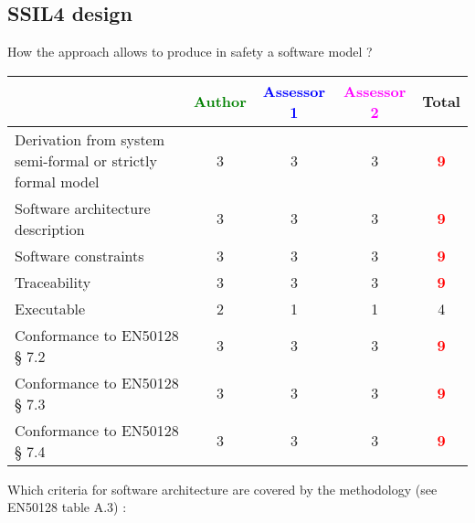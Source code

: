 \subsection{SSIL4 design}

How the approach allows to produce in safety a software model ?

\begin{tabular}{|l | c | c | c | c|}
\hline
& \textcolor{green}{Author} & \textcolor{blue}{Assessor 1} & \textcolor{magenta}{Assessor 2} & Total \\
\hline
Derivation from system semi-formal or strictly formal model  &3 & 3   & 3   & \textcolor{red}{\textbf{9}} \\
\hline 
Software architecture description  &3 & 3   & 3   & \textcolor{red}{\textbf{9}} \\
\hline
Software constraints  &3 & 3   & 3   & \textcolor{red}{\textbf{9}} \\
\hline
Traceability  &3 & 3   & 3   & \textcolor{red}{\textbf{9}} \\
\hline
Executable  &2 & 1   & 1   & 4    \\
\hline
Conformance to EN50128 § 7.2  &3 & 3   & 3   & \textcolor{red}{\textbf{9}} \\
\hline
Conformance to EN50128 § 7.3  &3 & 3   & 3   & \textcolor{red}{\textbf{9}} \\
\hline
Conformance to EN50128 § 7.4  & 3   & 3   & 3   & \textcolor{red}{\textbf{9}} \\
\hline
\end{tabular}

Which criteria for software architecture are covered by the methodology
(see EN50128 table A.3) :

